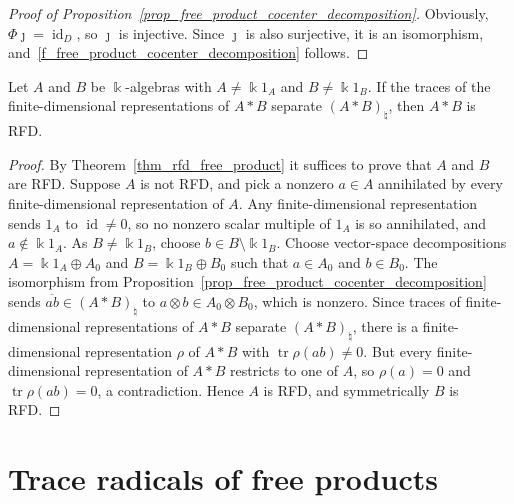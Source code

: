 \begin{proof}[Proof of Proposition~\ref{prop_free_product_cocenter_decomposition}]
    Obviously, \(\Phi\jmath=\operatorname{id}_D\), so \(\jmath\) is injective.
    Since \(\jmath\) is also surjective, it is an isomorphism, and~\eqref{f_free_product_cocenter_decomposition} follows.
\end{proof}

\begin{corollary}\label{cor_trace_separation_upgrade}
    Let \(A\) and \(B\) be \(\Bbbk\)-algebras with \(A\neq\Bbbk1_A\) and \(B\neq\Bbbk1_B\). If the traces of the finite-dimensional representations of \(A*B\) separate \((A*B)_{\natural}\), then \(A*B\) is RFD.
\end{corollary}
\begin{proof}
    By Theorem~\ref{thm_rfd_free_product} it suffices to prove that \(A\) and \(B\) are RFD. Suppose \(A\) is not RFD, and pick a nonzero \(a\in A\) annihilated by every finite-dimensional representation of \(A\).
    Any finite-dimensional representation sends \(1_A\) to \(\operatorname{id}\neq0\), so no nonzero scalar multiple of \(1_A\) is so annihilated, and \(a\notin\Bbbk1_A\).
    As \(B\neq\Bbbk1_B\), choose \(b\in B\setminus\Bbbk1_B\).
    Choose vector-space decompositions \(A=\Bbbk1_A\oplus A_0\) and \(B=\Bbbk1_B\oplus B_0\) such that \(a\in A_0\) and \(b\in B_0\).
    The isomorphism from Proposition~\ref{prop_free_product_cocenter_decomposition} sends \(\overline{ab}\in (A*B)_{\natural}\) to \(a\otimes b\in A_0\otimes B_0\), which is nonzero. Since traces of finite-dimensional representations of \(A*B\) separate \((A*B)_{\natural}\), there is a finite-dimensional representation \(\rho\) of \(A*B\) with \(\operatorname{tr}\rho(ab)\neq0\).
    But every finite-dimensional representation of \(A*B\) restricts to one of \(A\), so \(\rho(a)=0\) and \(\operatorname{tr}\rho(ab)=0\), a contradiction.
    Hence \(A\) is RFD, and symmetrically \(B\) is RFD.
\end{proof}



\section{Trace radicals of free products}\label{sec:trace_refinement}

